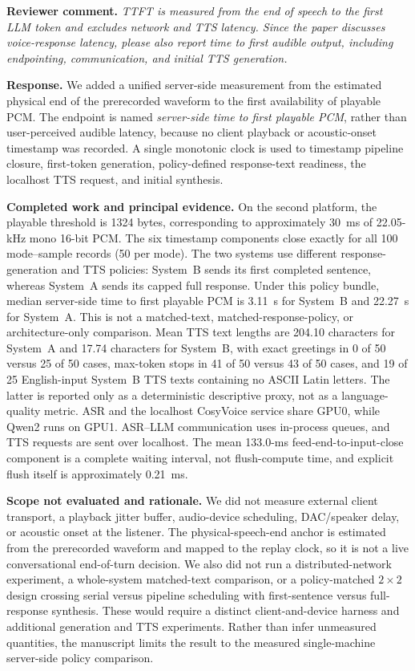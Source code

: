 \documentclass[11pt]{article}
\newcommand{\reviewcomment}[1]{\vspace{0.4em}\noindent\textbf{Reviewer comment.} \emph{#1}}
\newcommand{\response}{\vspace{0.25em}\noindent\textbf{Response.} }
\newcommand{\completed}{\vspace{0.25em}\noindent\textbf{Completed work and principal evidence.} }
\newcommand{\scope}{\vspace{0.25em}\noindent\textbf{Scope not evaluated and rationale.} }
\begin{document}
\reviewcomment{TTFT is measured from the end of speech to the first LLM token and excludes network and TTS latency. Since the paper discusses voice-response latency, please also report time to first audible output, including endpointing, communication, and initial TTS generation.}

\response We added a unified server-side measurement from the estimated physical end of the prerecorded waveform to the first availability of playable PCM. The endpoint is named \emph{server-side time to first playable PCM}, rather than user-perceived audible latency, because no client playback or acoustic-onset timestamp was recorded. A single monotonic clock is used to timestamp pipeline closure, first-token generation, policy-defined response-text readiness, the localhost TTS request, and initial synthesis.

\completed On the second platform, the playable threshold is 1324 bytes, corresponding to approximately 30~ms of 22.05-kHz mono 16-bit PCM. The six timestamp components close exactly for all 100 mode--sample records (50 per mode). The two systems use different response-generation and TTS policies: System~B sends its first completed sentence, whereas System~A sends its capped full response. Under this policy bundle, median server-side time to first playable PCM is 3.11~s for System~B and 22.27~s for System~A. This is not a matched-text, matched-response-policy, or architecture-only comparison. Mean TTS text lengths are 204.10 characters for System~A and 17.74 characters for System~B, with exact greetings in 0 of 50 versus 25 of 50 cases, max-token stops in 41 of 50 versus 43 of 50 cases, and 19 of 25 English-input System~B TTS texts containing no ASCII Latin letters. The latter is reported only as a deterministic descriptive proxy, not as a language-quality metric. ASR and the localhost CosyVoice service share GPU0, while Qwen2 runs on GPU1. ASR--LLM communication uses in-process queues, and TTS requests are sent over localhost. The mean 133.0-ms feed-end-to-input-close component is a complete waiting interval, not flush-compute time, and explicit flush itself is approximately 0.21~ms.

\scope We did not measure external client transport, a playback jitter buffer, audio-device scheduling, DAC/speaker delay, or acoustic onset at the listener. The physical-speech-end anchor is estimated from the prerecorded waveform and mapped to the replay clock, so it is not a live conversational end-of-turn decision. We also did not run a distributed-network experiment, a whole-system matched-text comparison, or a policy-matched $2\times2$ design crossing serial versus pipeline scheduling with first-sentence versus full-response synthesis. These would require a distinct client-and-device harness and additional generation and TTS experiments. Rather than infer unmeasured quantities, the manuscript limits the result to the measured single-machine server-side policy comparison.
\end{document}
